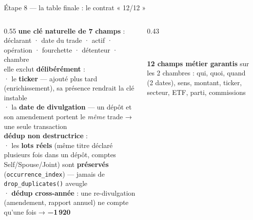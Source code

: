 \documentclass[11pt,aspectratio=169]{beamer}
\newcommand{\co}[1]{\texttt{#1}}
\begin{document}
\begin{frame}{Étape 8 — la table finale : le contrat « 12/12 »}
  \begin{columns}[T]
    \begin{column}{0.55\textwidth}\footnotesize
      \textbf{une clé naturelle de 7 champs} :\\
      {\scriptsize déclarant · date du trade · actif · opération · fourchette ·
       détenteur · chambre}\\[1.5mm]
      {\scriptsize elle exclut \textbf{délibérément} :\\
       · le \textbf{ticker} — ajouté plus tard (enrichissement), sa présence rendrait
         la clé instable\\
       · la \textbf{date de divulgation} — un dépôt et son amendement portent le
         \emph{même} trade → une seule transaction}\\[2mm]
      \textbf{dédup non destructrice} :\\
      {\scriptsize · les \textbf{lots réels} (même titre déclaré plusieurs fois dans un
        dépôt, comptes Self/Spouse/Joint) sont \textbf{préservés}
        (\co{occurrence\_index}) — jamais de \co{drop\_duplicates()} aveugle\\
       · \textbf{dédup cross-année} : une re-divulgation (amendement, rapport annuel)
        ne compte qu'une fois → \textbf{−1\,920}}
    \end{column}
    \begin{column}{0.43\textwidth}
      \centering
      \\[3mm]
      \colorbox{helec}{\parbox{0.9\linewidth}{\footnotesize\color{white}\centering
        \textbf{12 champs métier garantis} sur les 2 chambres : qui, quoi, quand
        (2 dates), sens, montant, ticker, secteur, ETF, parti, commissions}}
    \end{column}
  \end{columns}
\end{frame}
\end{document}
